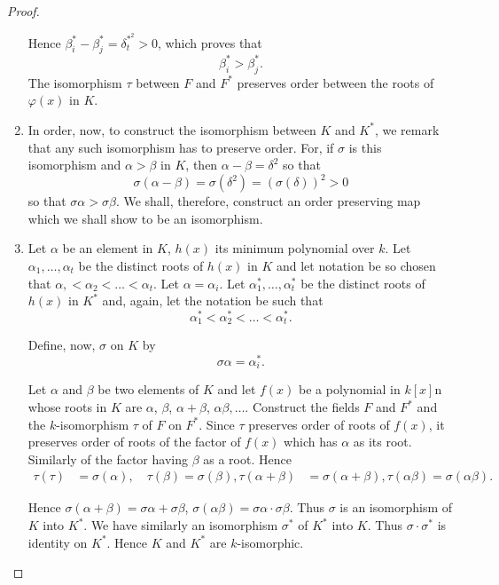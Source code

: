 \begin{proof}
\begin{enumerate}[1)]
Hence $\beta^{\ast}_i - \beta^{\ast}_j = \delta^{\ast^2}_t >0$, which
proves that 
$$
\beta^{\ast}_i > \beta^{\ast}_j.
$$\pageoriginale
The isomorphism $\tau$ between $F$ and $F^{\ast}$ preserves order
between the roots of $\varphi(x)$ in $K$.

\item In order, now, to construct the isomorphism between $K$ and
  $K^{\ast}$, we remark that any such isomorphism has to preserve
  order. For, if $\sigma$ is this isomorphism and $\alpha > \beta$ in
  $K$, then $\alpha - \beta = \delta^2$ so that 
$$
\sigma (\alpha - \beta) = \sigma(\delta^2) = (\sigma(\delta))^2 > 0 
$$
so that $\sigma \alpha > \sigma \beta$. We shall, therefore, construct
an order preserving map which we shall show to be an isomorphism.

\item Let $\alpha$ be an element in $K$, $h(x)$ its minimum polynomial
  over $k$. Let $\alpha_1, \ldots, \alpha_t$ be the distinct roots of
  $h(x)$ in $K$ and let notation be so chosen that $\alpha, < \alpha_2
  < \ldots < \alpha_t$. Let $\alpha = \alpha_i$. Let
  $\alpha^{\ast}_1, \ldots, \alpha^{\ast}_t$ be the distinct roots of
  $h(x)$ in $K^{\ast}$ and, again, let the notation be such that
$$
\alpha^{\ast}_1 < \alpha^{\ast}_2 < \ldots < \alpha^{\ast}_t.
$$

Define, now, $\sigma$ on $K$ by 
$$
\sigma \alpha = \alpha^{\ast}_i.
$$

Let $\alpha$ and $\beta$ be two elements of $K$ and let $f(x)$ be a
polynomial in $k[x]$n whose roots in $K$ are $\alpha$, $\beta$,
$\alpha+\beta$, $\alpha \beta, \ldots$. Construct the fields $F$ and
$F^{\ast}$ and the $k$-isomorphism $\tau$ of $F$ on $F^{\ast}$. Since
$\tau$ preserves order of roots of $f(x)$, it preserves order of roots
of the factor of $f(x)$ which has $\alpha$ as its root. Similarly of
the factor having $\beta$ as a root. Hence
\begin{align*}
\tau(\tau) & = \sigma (\alpha), \quad \tau (\beta) = \sigma (\beta),
\tau(\alpha + \beta) & = \sigma (\alpha + \beta), \tau (\alpha \beta)
= \sigma (\alpha \beta).
\end{align*}\pageoriginale

Hence $\sigma(\alpha + \beta) = \sigma \alpha + \sigma \beta$, $\sigma
(\alpha \beta) = \sigma \alpha \cdot \sigma \beta$. Thus $\sigma$ is
an isomorphism of $K$ into $K^{\ast}$. We have similarly an
isomorphism $\sigma^{\ast}$ of $K^{\ast}$ into $K$. Thus $\sigma \cdot
\sigma^{\ast}$ is identity on $K^{\ast}$. Hence $K$ and $K^{\ast}$ are
$k$-isomorphic.
\end{enumerate}
\end{proof}

